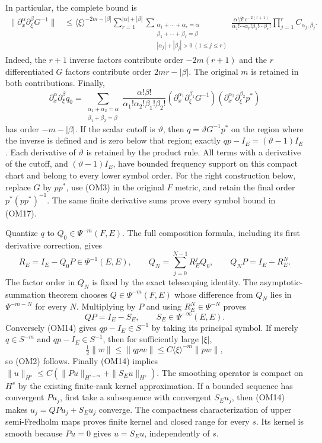 \documentclass[
  11pt,
]{article}
\begin{document}
In particular, the complete bound is \[
 \begin{aligned}
 \|\partial_x^\alpha\partial_\xi^\beta G^{-1}\|
 &\le\langle\xi\rangle^{-2m-|\beta|}
 \sum_{r=1}^{|\alpha|+|\beta|}
 \sum_{\substack{\alpha_1+\cdots+\alpha_r=\alpha\\
                 \beta_1+\cdots+\beta_r=\beta\\
                 |\alpha_j|+|\beta_j|>0\ (1\le j\le r)}}
 \frac{\alpha!\beta!\,c^{-2(r+1)}}
      {\alpha_1!\cdots\alpha_r!\beta_1!\cdots\beta_r!}
 \prod_{j=1}^r C_{\alpha_j,\beta_j}.
 \end{aligned}
 \tag{OI3}
\] Indeed, the \(r+1\) inverse factors contribute order \(-2m(r+1)\) and
the \(r\) differentiated \(G\) factors contribute order \(2mr-|\beta|\).
The original \(m\) is retained in both contributions. Finally, \[
 \partial_x^\alpha\partial_\xi^\beta q_0
 =\sum_{\substack{\alpha_1+\alpha_2=\alpha\\
                 \beta_1+\beta_2=\beta}}
 \frac{\alpha!\beta!}{\alpha_1!\alpha_2!\beta_1!\beta_2!}
 (\partial_x^{\alpha_1}\partial_\xi^{\beta_1}G^{-1})
 (\partial_x^{\alpha_2}\partial_\xi^{\beta_2}p^*)
 \tag{OI4}
\] has order \(-m-|\beta|\). If the scalar cutoff is \(\vartheta\), then
\(q=\vartheta G^{-1}p^*\) on the region where the inverse is defined and
is zero below that region; exactly \(qp-I_E=(\vartheta-1)I_E\). Each
derivative of \(\vartheta\) is retained by the product rule. All terms
with a derivative of the cutoff, and \((\vartheta-1)I_E\), have bounded
frequency support on this compact chart and belong to every lower symbol
order. For the right construction below, replace \(G\) by \(pp^*\), use
(OM3) in the original \(F\) metric, and retain the final order
\(p^*(pp^*)^{-1}\). The same finite derivative sums prove every symbol
bound in (OM17).

Quantize \(q\) to \(Q_0\in\Psi^{-m}(F,E)\). The full composition
formula, including its first derivative correction, gives \[
 R_E=I_E-Q_0P\in\Psi^{-1}(E,E),\qquad
 Q_N=\sum_{j=0}^{N-1}R_E^jQ_0,\qquad
 Q_NP=I_E-R_E^N.
 \tag{OM13}
\] The factor order in \(Q_N\) is fixed by the exact telescoping
identity. The asymptotic-summation theorem chooses
\(Q\in\Psi^{-m}(F,E)\) whose difference from \(Q_N\) lies in
\(\Psi^{-m-N}\) for every \(N\). Multiplying by \(P\) and using
\(R_E^N\in\Psi^{-N}\) proves \[
 QP=I_E-S_E,\qquad S_E\in\Psi^{-\infty}(E,E).
 \tag{OM14}
\] Conversely (OM14) gives \(qp-I_E\in S^{-1}\) by taking its principal
symbol. If merely \(q\in S^{-m}\) and \(qp-I_E\in S^{-1}\), then for
sufficiently large \(|\xi|\), \[
 \tfrac12\|w\|\le\|qpw\|
       \le C\langle\xi\rangle^{-m}\|pw\|,
 \tag{OM15}
\] so (OM2) follows. Finally (OM14) implies
\(\|u\|_{H^s}\le C(\|Pu\|_{H^{s-m}}+\|S_Eu\|_{H^s})\). The smoothing
operator is compact on \(H^s\) by the existing finite-rank kernel
approximation. If a bounded sequence has convergent \(Pu_j\), first take
a subsequence with convergent \(S_Eu_j\), then (OM14) makes
\(u_j=QPu_j+S_Eu_j\) converge. The compactness characterization of upper
semi-Fredholm maps proves finite kernel and closed range for every
\(s\). Its kernel is smooth because \(Pu=0\) gives \(u=S_Eu\),
independently of \(s\).
\end{document}

